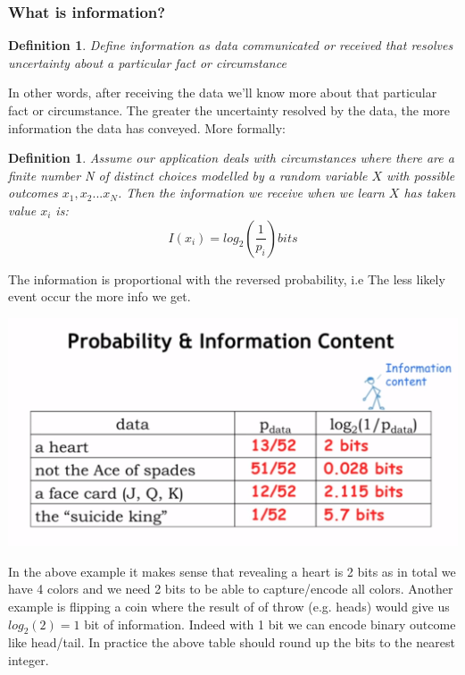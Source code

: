\documentclass[a4paper,twoside]{article}
\newtheorem{definition}[theorem]{Definition}
\numberwithin{equation}{section}
\begin{document}
\subsubsection{What is information?}
\label{What is information?}
\begin{definition}
    Define information as data communicated or received that resolves uncertainty about a particular
     fact or circumstance
\end{definition}
In other words, after receiving the data we'll know more about that particular fact or circumstance.
 The greater the uncertainty resolved by the data, the more information the data has conveyed. More formally:
\begin{definition}
    Assume our application deals with circumstances where there are a finite number N of distinct
    choices modelled by a random variable $X$ with possible outcomes $x_1, x_2 ... x_N$.
    Then the information we receive when we learn $X$ has taken value $x_i$ is:
    \begin{equation}
        I(x_i) = log_2(\dfrac{1}{p_i}) bits
    \end{equation}
\end{definition}
The information is proportional with the reversed probability, i.e The less likely event occur the
 more info we get.
\begin{center}
    \includegraphics[scale=0.2]{assets/prob_information.png}
\end{center}
In the above example it makes sense that revealing a heart is 2 bits as in total we have 4 colors and
we need 2 bits to be able to capture/encode all colors. Another example is flipping a coin where the
 result of of throw (e.g. heads) would give us $log_2(2) = 1$ bit of information. Indeed with 1 bit
 we can encode binary outcome like head/tail. In practice the above table should round up the bits
  to the nearest integer.
\end{document}
